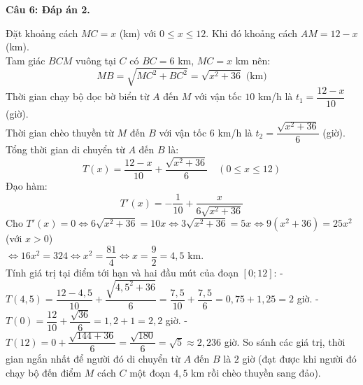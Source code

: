 \documentclass[12pt,a4paper]{article}
\newcommand{\loigiai}[1]{\par\medskip\Needspace{4\baselineskip}\noindent\textbf{#1}\par\nobreak}
\begin{document}
\loigiai{Câu 6: Đáp án 2.}
Đặt khoảng cách $MC=x$ (km) với $0\le x\le12$. Khi đó khoảng cách $AM=12-x$ (km).\\
Tam giác $BCM$ vuông tại $C$ có $BC=6$ km, $MC=x$ km nên:
\[ MB=\sqrt{MC^2+BC^2}=\sqrt{x^2+36}\text{ (km)} \]
Thời gian chạy bộ dọc bờ biển từ $A$ đến $M$ với vận tốc $10$ km/h là $t_1=\dfrac{12-x}{10}$ (giờ).\\
Thời gian chèo thuyền từ $M$ đến $B$ với vận tốc $6$ km/h là $t_2=\dfrac{\sqrt{x^2+36}}{6}$ (giờ).\\
Tổng thời gian di chuyển từ $A$ đến $B$ là:
\[ T(x)=\dfrac{12-x}{10}+\dfrac{\sqrt{x^2+36}}{6}\quad (0\le x\le12) \]
Đạo hàm:
\[ T'(x)=-\dfrac{1}{10}+\dfrac{x}{6\sqrt{x^2+36}} \]
Cho $T'(x)=0\iff 6\sqrt{x^2+36}=10x\iff 3\sqrt{x^2+36}=5x\iff 9(x^2+36)=25x^2$ (với $x>0$)\\
$\iff 16x^2=324\iff x^2=\dfrac{81}{4}\iff x=\dfrac{9}{2}=4{,}5$ km.\\
Tính giá trị tại điểm tới hạn và hai đầu mút của đoạn $[0;12]$:
- $T(4{,}5)=\dfrac{12-4{,}5}{10}+\dfrac{\sqrt{4{,}5^2+36}}{6}=\dfrac{7{,}5}{10}+\dfrac{7{,}5}{6}=0{,}75+1{,}25=2$ giờ.
- $T(0)=\dfrac{12}{10}+\dfrac{\sqrt{36}}{6}=1{,}2+1=2{,}2$ giờ.
- $T(12)=0+\dfrac{\sqrt{144+36}}{6}=\dfrac{\sqrt{180}}{6}=\sqrt5\approx2{,}236$ giờ.
So sánh các giá trị, thời gian ngắn nhất để người đó di chuyển từ $A$ đến $B$ là $2$ giờ (đạt được khi người đó chạy bộ đến điểm $M$ cách $C$ một đoạn $4{,}5$ km rồi chèo thuyền sang đảo).
\end{document}
